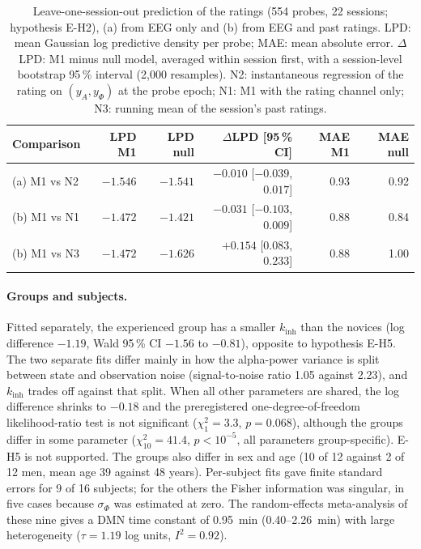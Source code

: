 \documentclass[12pt,a4paper]{article}
\theoremstyle{plain}
\theoremstyle{definition}
\theoremstyle{remark}
\newcommand{\kinh}{k_{\mathrm{inh}}}
\newcommand{\sPhi}{\sigma_{\Phi}}
\begin{document}
\begin{table}[t]
\centering\small
\caption{Leave-one-session-out prediction of the ratings (554 probes, 22 sessions; hypothesis E-H2), (a) from EEG only and (b) from EEG and past ratings. LPD: mean Gaussian log predictive density per probe; MAE: mean absolute error. $\Delta$LPD: M1 minus null model, averaged within session first, with a session-level bootstrap 95\,\% interval (2{,}000 resamples). N2: instantaneous regression of the rating on $(y_A,y_\Phi)$ at the probe epoch; N1: M1 with the rating channel only; N3: running mean of the session's past ratings.}
\label{tab:real-loso}
\footnotesize\setlength{\tabcolsep}{4pt}
\begin{tabular}{lrrrrr}
\toprule
Comparison & LPD M1 & LPD null & $\Delta$LPD [95\,\% CI] & MAE M1 & MAE null \\
\midrule
(a) M1 vs N2 & $-1.546$ & $-1.541$ & $-0.010$ [$-0.039$, $0.017$] & 0.93 & 0.92 \\
(b) M1 vs N1 & $-1.472$ & $-1.421$ & $-0.031$ [$-0.103$, $0.009$] & 0.88 & 0.84 \\
(b) M1 vs N3 & $-1.472$ & $-1.626$ & $+0.154$ [$0.083$, $0.233$] & 0.88 & 1.00 \\
\bottomrule
\end{tabular}
\end{table}

\paragraph{Groups and subjects.} Fitted separately, the experienced group has a smaller $\kinh$ than the novices (log difference $-1.19$, Wald 95\,\% CI $-1.56$ to $-0.81$), opposite to hypothesis E-H5. The two separate fits differ mainly in how the alpha-power variance is split between state and observation noise (signal-to-noise ratio 1.05 against 2.23), and $\kinh$ trades off against that split. When all other parameters are shared, the log difference shrinks to $-0.18$ and the preregistered one-degree-of-freedom likelihood-ratio test is not significant ($\chi^2_1=3.3$, $p=0.068$), although the groups differ in some parameter ($\chi^2_{10}=41.4$, $p<10^{-5}$, all parameters group-specific). E-H5 is not supported. The groups also differ in sex and age (10 of 12 against 2 of 12 men, mean age 39 against 48 years). Per-subject fits gave finite standard errors for 9 of 16 subjects; for the others the Fisher information was singular, in five cases because $\sPhi$ was estimated at zero. The random-effects meta-analysis \citep{Viechtbauer2005} of these nine gives a DMN time constant of 0.95~min (0.40--2.26~min) with large heterogeneity ($\tau=1.19$ log units, $I^2=0.92$).
\end{document}
